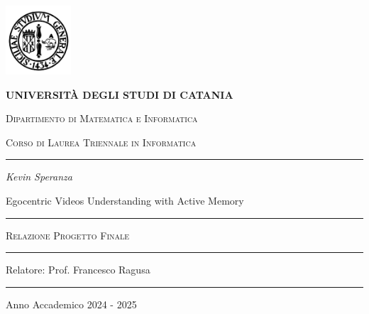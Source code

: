 \begin{titlepage}
\centering 
\includegraphics[width=2.434cm,height=2.565cm]{Images/university_logo.png}

\bigskip

{\Large \textbf{UNIVERSIT\`A DEGLI STUDI DI CATANIA}}

{\scshape
\large
Dipartimento di Matematica e Informatica
}

{\scshape
\normalsize
Corso di Laurea Triennale in Informatica
}

\bigskip


\hrule


\bigskip


\bigskip


\bigskip


\bigskip

{\itshape
\large
Kevin Speranza
\par}


\bigskip


\bigskip


\bigskip


\bigskip

{\centering
\Large
Egocentric Videos Understanding with Active Memory
\par}


\bigskip


\bigskip


\bigskip


\bigskip


\bigskip


\bigskip


\begin{minipage}[b]{8 cm}
\hrule

\bigskip

{\centering\scshape 
Relazione Progetto Finale
\par}


\bigskip

\hrule
\end{minipage}
\bigskip


\bigskip


\bigskip


\bigskip


\bigskip


\bigskip


\bigskip


\bigskip


\bigskip


\bigskip


\bigskip

{\raggedleft
Relatore: Prof. Francesco Ragusa
\par}


\bigskip


\bigskip


\bigskip


\bigskip

\hrule

\bigskip

{\centering
Anno Accademico 2024 - 2025
\par}
\end{titlepage}
